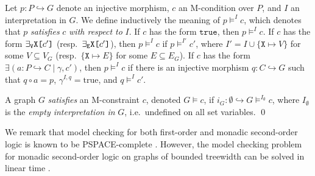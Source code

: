 \documentclass{llncs}
\newcommand{\mt}[1]{\text{\tt{#1}}}
\begin{document}
	
	\begin{definition}\rm
		Let $p\!:P\hookrightarrow G$ denote an injective morphism, $c$ an M-condition over $P$, and $I$ an interpretation in $G$. We define inductively the meaning of $p \models^I c$, which denotes that $p$ \emph{satisfies} $c$ \emph{with respect to} $I$. If $c$ has the form $\mathtt{true}$, then $p \models^I c$. If $c$ has the form $\exists_\mathtt{V}\mathtt{X}\mt{[}c'\mt{]}$ (resp.\ $\exists_\mathtt{E}\mathtt{X}\mt{[}c'\mt{]}$), then $p \models^I c$ if $p \models^{I'} c'$, where $I' = I \cup \{\mathtt{X}\mapsto V\}$ for some $V \subseteq V_G$ (resp.\ $\{\mathtt{X}\mapsto E\}$ for some $E\subseteq E_G$). If $c$ has the form $\exists (a\!: P \hookrightarrow C \mid \gamma, c')$, then $p \models^I c$ if there is an injective morphism $q\!:C\hookrightarrow G$ such that $q\circ a = p$, $\gamma^{I,q} = \text{true}$, and $q \models^{I} c'$.
		
		A graph $G$ \emph{satisfies} an M-constraint $c$, denoted $G \models c$, if $i_G\!:\emptyset \hookrightarrow G \models^{I_\emptyset} c$, where $I_\emptyset$ is the \emph{empty interpretation in} $G$, i.e.\ undefined on all set variables.		
	\qed
	\end{definition}
	
	We remark that model checking for both first-order and monadic second-order logic is known to be PSPACE-complete \cite{Flum-Grohe06a}. However, the model checking problem for monadic second-order logic on graphs of bounded treewidth can be solved in linear time \cite{Courcelle90b}.
\end{document}

